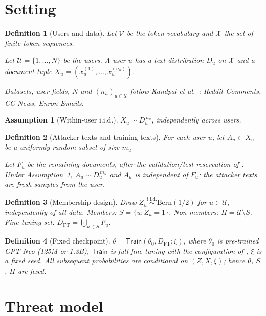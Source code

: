 \documentclass[11pt]{article}
\newtheorem{definition}{Definition}
\newtheorem{assumption}{Assumption}
\theoremstyle{remark}
\newcommand{\X}{\mathcal{X}}
\newcommand{\U}{\mathcal{U}}
\newcommand{\Bern}{\mathrm{Bern}}
\newcommand{\Train}{\mathsf{Train}}
\begin{document}
\section{Setting}

\begin{definition}[Users and data]
Let $\mathcal{V}$ be the token vocabulary and $\X$ the set of finite token sequences.

Let $\U = \{1,\dots,N\}$ be the users. A user $u$ has a text distribution $D_u$ on $\X$ and a document tuple $X_u = (x_u^{(1)},\dots,x_u^{(n_u)})$.

Datasets, user fields, $N$ and $(n_u)_{u\in\U}$ follow Kandpal et al.~\cite{kandpal2024}: Reddit Comments, CC News, Enron Emails.
\end{definition}

\begin{assumption}[Within-user i.i.d.]\label{ass:iid}
$X_u \sim D_u^{\,n_u}$, independently across users.
\end{assumption}

\begin{definition}[Attacker texts and training texts]
For each user $u$, let $A_u \subset X_u$ be a uniformly random subset of size $m_u$

Let $F_u$ be the remaining documents, after the validation/test reservation of \cite{kandpal2024}. Under Assumption~\ref{ass:iid}, $A_u \sim D_u^{\,m_u}$ and $A_u$ is independent of $F_u$: the attacker texts are fresh samples from the user.
\end{definition}

\begin{definition}[Membership design]
Draw $Z_u \overset{\text{i.i.d.}}{\sim} \Bern(1/2)$ for $u\in\U$, independently of all data. Members: $S = \{u : Z_u = 1\}$. Non-members: $H = \U \setminus S$. Fine-tuning set: $D_{\mathrm{FT}} = \biguplus_{u\in S} F_u$.
\end{definition}

\begin{definition}[Fixed checkpoint]
$\theta = \Train(\theta_0, D_{\mathrm{FT}}; \xi)$, where $\theta_0$ is pre-trained GPT-Neo (125M or 1.3B), $\Train$ is full fine-tuning with the configuration of \cite{kandpal2024}, $\xi$ is a fixed seed.
All subsequent probabilities are conditional on $(Z, X, \xi)$; hence $\theta$, $S$, $H$ are fixed.
\end{definition}

\section{Threat model}
\end{document}
